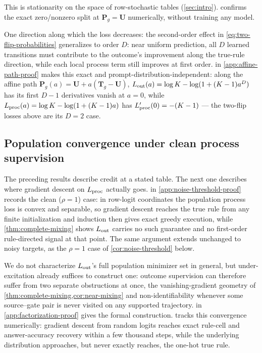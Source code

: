 This is stationarity on the space of row-stochastic tables (\cref{sec:intro}).
 confirms the exact zero/nonzero split at
$\bm{P}_g=\bm{U}$ numerically, without training any model.

One direction along which the loss decreases: the second-order effect in
\cref{eq:two-flip-probabilities} generalizes to
order $D$: near uniform prediction, all $D$ learned transitions must
contribute to the outcome's improvement along the true-rule direction,
while each local process term still improves at first order.
 in \cref{app:affine-path-proof} makes this exact and
prompt-distribution-independent: along the affine path
$\bm{P}_g(a)=\bm{U}+a(\bm{T}_g-\bm{U})$, $L_{\rm out}(a)=\log K-\log(1+(K-1)a^D)$
has its first $D-1$ derivatives vanish at $a=0$, while
$L_{\rm proc}(a)=\log K-\log(1+(K-1)a)$ has $L_{\rm proc}'(0)=-(K-1)$ ---
the two-flip losses above are its $D=2$ case.

\subsection{Population convergence under clean process supervision}

The preceding results describe credit at a stated table. The next one
describes where gradient descent on $L_{\rm proc}$ actually goes.
 in \cref{app:noise-threshold-proof} records
the clean ($\rho=1$) case: in row-logit coordinates the population process
loss is convex and separable, so gradient descent reaches the true rule
from any finite initialization and induction then gives exact greedy
execution, while \cref{thm:complete-mixing} shows $L_{\rm out}$ carries no
such guarantee and no first-order rule-directed signal at that point. The
same argument extends unchanged to noisy targets, as the $\rho=1$ case of
\cref{cor:noise-threshold} below.

We do not characterize $L_{\rm out}$'s full population minimizer set in
general, but under-excitation already suffices to construct one: outcome
supervision can therefore suffer from two separate obstructions at once,
the vanishing-gradient geometry of \cref{thm:complete-mixing,cor:near-mixing}
and non-identifiability whenever some source--gate pair is never visited
on any supported trajectory.  in
\cref{app:factorization-proof} gives the formal construction.
 tracks this convergence numerically: gradient
descent from random logits reaches exact rule-cell and answer-accuracy
recovery within a few thousand steps, while the underlying distribution
approaches, but never exactly reaches, the one-hot true rule.

